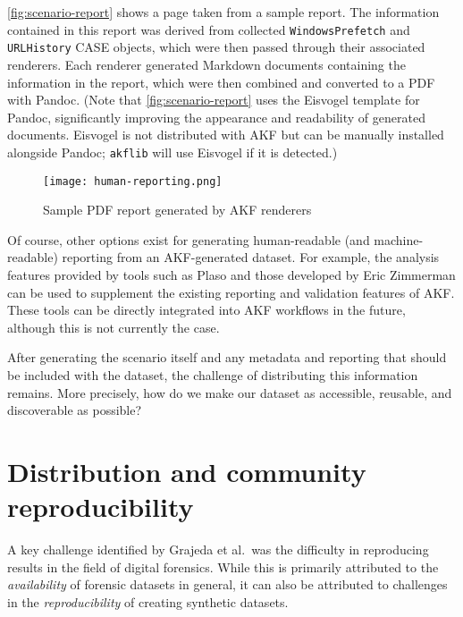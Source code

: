 \autoref{fig:scenario-report} shows a page taken from a sample report.
The information contained in this report was derived from collected
\passthrough{\lstinline!WindowsPrefetch!} and
\passthrough{\lstinline!URLHistory!} CASE objects, which were then
passed through their associated renderers. Each renderer generated
Markdown documents containing the information in the report, which were
then combined and converted to a PDF with Pandoc. (Note that
\autoref{fig:scenario-report} uses the Eisvogel template
\cite{waglerWandmalfarbePandoclatextemplate2025} for Pandoc,
significantly improving the appearance and readability of generated
documents. Eisvogel is not distributed with AKF but can be manually
installed alongside Pandoc; \passthrough{\lstinline!akflib!} will use
Eisvogel if it is detected.)

\begin{figure}[h]
\centering
\texttt{[image: human-reporting.png]}
\caption{Sample PDF report generated by AKF
renderers}\label{fig:scenario-report}
\end{figure}

Of course, other options exist for generating human-readable (and
machine-readable) reporting from an AKF-generated dataset. For example,
the analysis features provided by tools such as Plaso
\cite{Log2timelinePlaso2025} and those developed by Eric Zimmerman
\cite{zimmermanEricZimmermansTools} can be used to supplement the
existing reporting and validation features of AKF. These tools can be
directly integrated into AKF workflows in the future, although this is
not currently the case.

After generating the scenario itself and any metadata and reporting that
should be included with the dataset, the challenge of distributing this
information remains. More precisely, how do we make our dataset as
accessible, reusable, and discoverable as possible?

\section{Distribution and community
reproducibility}\label{distribution-and-community-reproducibility}

A key challenge identified by Grajeda et al.~was the difficulty in
reproducing results in the field of digital forensics. While this is
primarily attributed to the \emph{availability} of forensic datasets in
general, it can also be attributed to challenges in the
\emph{reproducibility} of creating synthetic datasets.

